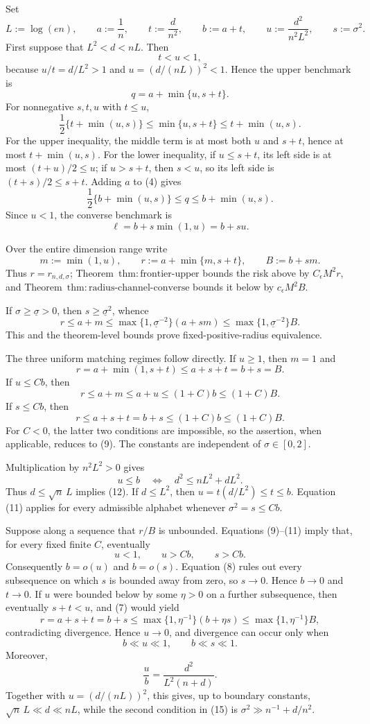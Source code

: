 Set
\[
 L:=\log(en),\qquad a:=\frac1n,\qquad t:=\frac d{n^2},
 \qquad b:=a+t,\qquad u:=\frac{d^2}{n^2L^2},
 \qquad s:=\sigma^2.
\tag{1}
\]
First suppose that \(L^2<d<nL\).  Then
\[
 t<u<1,
\tag{2}
\]
because \(u/t=d/L^2>1\) and \(u=(d/(nL))^2<1\).  Hence the upper benchmark is
\[
 q=a+\min\{u,s+t\}.
\tag{3}
\]
For nonnegative \(s,t,u\) with \(t\le u\),
\[
 \frac12\{t+\min(u,s)\}
 \le \min\{u,s+t\}
 \le t+\min(u,s).
\tag{4}
\]
For the upper inequality, the middle term is at most both \(u\) and \(s+t\), hence at most \(t+\min(u,s)\).  For the lower inequality, if \(u\le s+t\), its left side is at most \((t+u)/2\le u\); if \(u>s+t\), then \(s<u\), so its left side is \((t+s)/2\le s+t\).  Adding \(a\) to (4) gives
\[
 \frac12\{b+\min(u,s)\}
 \le q\le b+\min(u,s).
\tag{5}
\]
Since \(u<1\), the converse benchmark is
\[
 \ell=b+s\min(1,u)=b+su.
\tag{6}
\]

Over the entire dimension range write
\[
 m:=\min(1,u),\qquad
 r:=a+\min\{m,s+t\},\qquad
 B:=b+sm.
\tag{7}
\]
Thus \(r=r_{n,d,\sigma}\); Theorem~\(\mathrm{thm:frontier\text{-}upper}\) bounds the risk above by \(C_\epsilon M^2r\), and Theorem~\(\mathrm{thm:radius\text{-}channel\text{-}converse}\) bounds it below by \(c_\epsilon M^2B\).

If \(\sigma\ge\underline\sigma>0\), then \(s\ge\underline\sigma^2\), whence
\[
 r\le a+m
 \le \max\{1,\underline\sigma^{-2}\}(a+sm)
 \le \max\{1,\underline\sigma^{-2}\}B.
\tag{8}
\]
This and the theorem-level bounds prove fixed-positive-radius equivalence.

The three uniform matching regimes follow directly.  If \(u\ge1\), then \(m=1\) and
\[
 r=a+\min(1,s+t)\le a+s+t=b+s=B.
\tag{9}
\]
If \(u\le Cb\), then
\[
 r\le a+m\le a+u\le(1+C)b\le(1+C)B.
\tag{10}
\]
If \(s\le Cb\), then
\[
 r\le a+s+t=b+s\le(1+C)b\le(1+C)B.
\tag{11}
\]
For \(C<0\), the latter two conditions are impossible, so the assertion, when applicable, reduces to (9).  The constants are independent of \(\sigma\in[0,2]\).

Multiplication by \(n^2L^2>0\) gives
\[
 u\le b
 \quad\Longleftrightarrow\quad
 d^2\le nL^2+dL^2.
\tag{12}
\]
Thus \(d\le\sqrt n\,L\) implies (12).  If \(d\le L^2\), then \(u=t(d/L^2)\le t\le b\).  Equation (11) applies for every admissible alphabet whenever \(\sigma^2=s\le Cb\).

Suppose along a sequence that \(r/B\) is unbounded.  Equations (9)--(11) imply that, for every fixed finite \(C\), eventually
\[
 u<1,\qquad u>Cb,\qquad s>Cb.
\tag{13}
\]
Consequently \(b=o(u)\) and \(b=o(s)\).  Equation (8) rules out every subsequence on which \(s\) is bounded away from zero, so \(s\to0\).  Hence \(b\to0\) and \(t\to0\).  If \(u\) were bounded below by some \(\eta>0\) on a further subsequence, then eventually \(s+t<u\), and (7) would yield
\[
 r=a+s+t=b+s
 \le \max\{1,\eta^{-1}\}(b+\eta s)
 \le \max\{1,\eta^{-1}\}B,
\tag{14}
\]
contradicting divergence.  Hence \(u\to0\), and divergence can occur only when
\[
 b\ll u\ll1,
 \qquad b\ll s\ll1.
\tag{15}
\]
Moreover,
\[
 \frac ub=\frac{d^2}{L^2(n+d)}.
\tag{16}
\]
Together with \(u=(d/(nL))^2\), this gives, up to boundary constants, \(\sqrt n\,L\ll d\ll nL\), while the second condition in (15) is \(\sigma^2\gg n^{-1}+d/n^2\).

